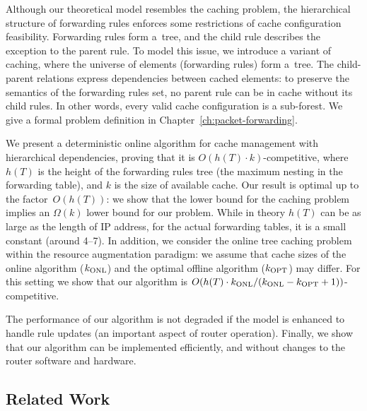 Although our theoretical model resembles the caching problem, the hierarchical structure of forwarding rules enforces some restrictions of cache configuration feasibility.
Forwarding rules form a~tree, and the child rule describes the exception to the parent rule.
To model this issue, we introduce a variant of caching, where the universe of elements (forwarding rules) form a~tree.
The child-parent relations express dependencies between cached elements: to preserve the semantics of the forwarding rules set, no parent rule can be in cache without its child rules.
In other words, every valid cache configuration is a sub-forest.
We give a formal problem definition in Chapter~\ref{ch:packet-forwarding}.


We present a deterministic online algorithm for cache management with hierarchical dependencies, proving that it is
$O(h(T)\cdot k)$-competitive, where $h(T)$ is the height of the forwarding rules tree (the maximum nesting in the forwarding table), and $k$ is the size of available cache.
Our result is optimal up to the factor~$O(h(T))$: we show that the lower
bound for the caching problem~\cite{SleTar85} implies an
$\Omega(k)$ lower bound for our problem.
While in theory $h(T)$ can be as large as the length of IP address, for the actual forwarding tables, it is a small constant (around 4--7).
In addition, we consider the online tree caching problem within the resource
augmentation paradigm: we assume that cache sizes of the online algorithm
($k_\textnormal{ONL}$)  and the optimal offline algorithm ($k_\textnormal{OPT}$) may differ.
For this setting we show that our algorithm is
$O(h(T) \cdot k_\textnormal{ONL}/(k_\textnormal{ONL}-k_\textnormal{OPT}+1))$-competitive.


The performance of our algorithm is not degraded if the model is enhanced to handle rule updates (an important aspect of router operation).
Finally, we show that our algorithm can be implemented efficiently, and without changes to the router software and hardware.

\subsection{Related Work}

